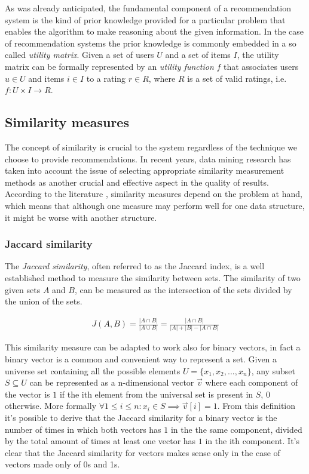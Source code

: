 As was already anticipated, the fundamental component of a recommendation system is the kind of prior knowledge provided for a particular problem that enables the algorithm to make reasoning about the given information. In the case of recommendation systems the prior knowledge is commonly embedded in a so called \emph{utility matrix}. Given a set of users $U$ and a set of items $I$, the utility matrix can be formally represented by an \emph{utility function} $f$ that associates users $u \in U$ and items $i \in I$ to a rating $r \in R$, where $R$ is a set of valid ratings, i.e. $f: U \times I \to R$.


\subsection{Similarity measures} \label{similatrity_measures}
The concept of similarity is crucial to the system regardless of the technique we choose to provide recommendations.  
In recent years, data mining research has taken into account the issue of selecting appropriate similarity measurement methods as another crucial and effective aspect in the quality of results. According to the literature \cite{similarity_approaches}, similarity measures depend on the problem at hand, which means that although one measure may perform well for one data structure, it might be worse with another structure. 

\subsubsection{Jaccard similarity}\label{similarity_measure_jaccard}
The \emph{Jaccard similarity}, often referred to as the Jaccard index, is a well established method to measure the similarity between sets. The similarity of two given sets $A$ and $B$, can be measured as the intersection of the sets divided by the union of the sets.

\begin{equation}
\begin{aligned}
J(A,B) = \frac{|A \cap B|}{|A \cup B|} = \frac{|A \cap B|}{|A| + |B| - |A \cap B|}
\end{aligned}
\end{equation}

This similarity measure can be adapted to work also for binary vectors, in fact a binary vector is a common and convenient way to represent a set. Given a universe set containing all the possible elements $U=\{x_1, x_2, ..., x_n\}$, any subset $S \subseteq U$ can be represented as a n-dimensional vector $\vec{v}$ where each component of the vector is $1$ if the ith element from the universal set is present in $S$, $0$ otherwise. More formally $\forall 1 \leq i \leq n \colon x_i \in S \implies \vec{v}[i] = 1$. From this definition it's possible to derive that the Jaccard similarity for a binary vector is the number of times in which both vectors has $1$ in the the same component, divided by the total amount of times at least one vector has $1$ in the ith component. It's clear that the Jaccard similarity for vectors makes sense only in the case of vectors made only of 0s and 1s.

